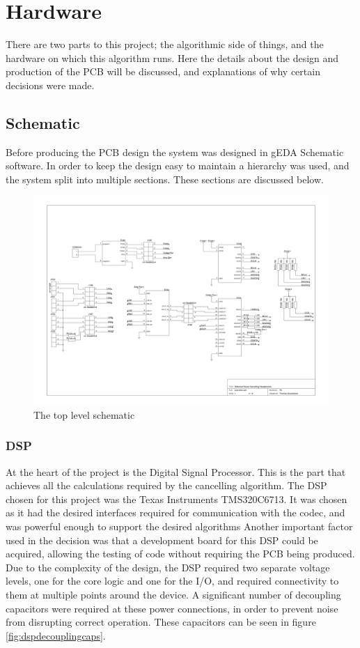 \section{Hardware}

There are two parts to this project; the algorithmic side of things, and the hardware on which this algorithm runs.
Here the details about the design and production of the PCB will be discussed, and explanations of why certain decisions were made.

\subsection{Schematic}
\label{sec:imple:hard:sch}
Before producing the PCB design the system was designed in gEDA Schematic software.
In order to keep the design easy to maintain a hierarchy was used, and the system split into multiple sections.
These sections are discussed below.

\begin{figure}[H]
	\centering
	\includegraphics[width=\textwidth]{./img/overview.png}
	\caption{The top level schematic}
	\label{fig:overviewsch}
\end{figure}

\subsubsection{DSP}
At the heart of the project is the Digital Signal Processor.
This is the part that achieves all the calculations required by the cancelling algorithm.
The DSP chosen for this project was the Texas Instruments TMS320C6713.
It was chosen as it had the desired interfaces required for communication with the codec, and was powerful enough to support the desired algorithms
Another important factor used in the decision was that a development board for this DSP could be acquired, allowing the testing of code without requiring the PCB being produced.
Due to the complexity of the design, the DSP required two separate voltage levels, one for the core logic and one for the I/O, and required connectivity to them at multiple points around the device.
A significant number of decoupling capacitors were required at these power connections, in order to prevent noise from disrupting correct operation.
These capacitors can be seen in figure \ref{fig:dspdecouplingcaps}.

